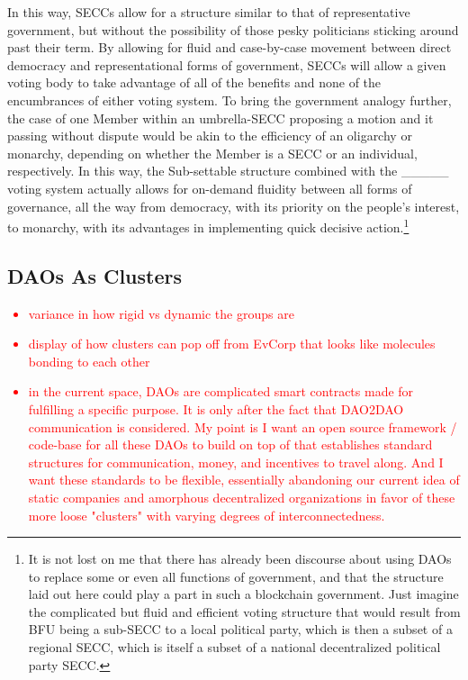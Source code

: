 \documentclass{article}[10pt]
\begin{document}
In this way, SECCs allow for a structure similar to that of representative government, but without the possibility of those pesky politicians sticking around past their term.
By allowing for fluid and case-by-case movement between direct democracy and representational forms of government, SECCs will allow a given voting body to take advantage of all of the benefits and none of the encumbrances of either voting system.
To bring the government analogy further, the case of one Member within an umbrella-SECC proposing a motion and it passing without dispute would be akin to the efficiency of an oligarchy or monarchy, depending on whether the Member is a SECC or an individual, respectively.
In this way, the Sub-settable structure combined with the \_\_\_\_\_ voting system actually allows for on-demand fluidity between all forms of governance, all the way from democracy, with its priority on the people's interest, to monarchy, with its advantages in implementing quick decisive action.\footnote{
    It is not lost on me that there has already been discourse about using DAOs to replace some or even all functions of government, and that the structure laid out here could play a part in such a blockchain government.
    Just imagine the complicated but fluid and efficient voting structure that would result from BFU being a sub-SECC to a local political party, which is then a subset of a regional SECC, which is itself a subset of a national decentralized political party SECC.}\par







\subsection{DAOs As Clusters}
\label{subsection:clusters}

\textcolor{red}{\begin{itemize}
    \item variance in how rigid vs dynamic the groups are
    \item display of how clusters can pop off from EvCorp that looks like molecules bonding to each other
    \item in the current space, DAOs are complicated smart contracts made for fulfilling a specific purpose. It is only after the fact that DAO2DAO communication is considered. My point is I want an open source framework / code-base for all these DAOs to build on top of that establishes standard structures for communication, money, and incentives to travel along. And I want these standards to be flexible, essentially abandoning our current idea of static companies and amorphous decentralized organizations in favor of these more loose "clusters" with varying degrees of interconnectedness.
\end{itemize}}
\end{document}
